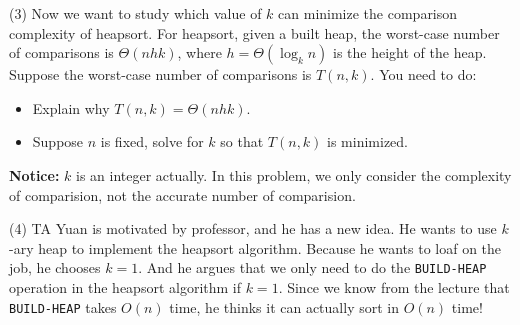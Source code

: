 \documentclass{article}
\begin{document}
\newpage
(3) Now we want to study which value of $k$ can minimize the comparison complexity of heapsort. For heapsort, given a built heap, the worst-case number of comparisons is $\Theta(nhk)$, where $h=\Theta(\log_kn)$ is the height of the heap. Suppose the worst-case number of comparisons is $T(n,k)$. You need to do: 

\begin{itemize}
	\item{Explain why $T(n,k) = \Theta(nhk)$.}
	\item{Suppose $n$ is fixed, solve for $k$ so that $T(n,k)$ is minimized.}
\end{itemize}

\textbf{Notice: } $k$ is an integer actually. In this problem, we only consider the complexity of comparision, not the accurate number of comparision.




























\newpage
(4) TA Yuan is motivated by professor, and he has a new idea. He wants to use $k$-ary heap to implement the heapsort algorithm. Because he wants to loaf on the job, he chooses $k=1$. And he argues that we only need to do the \texttt{BUILD-HEAP} operation in the heapsort algorithm if $k = 1$. Since we know from the lecture that \texttt{BUILD-HEAP} takes $O(n)$ time, he thinks it can actually sort in $O(n)$ time! 
\end{document}
